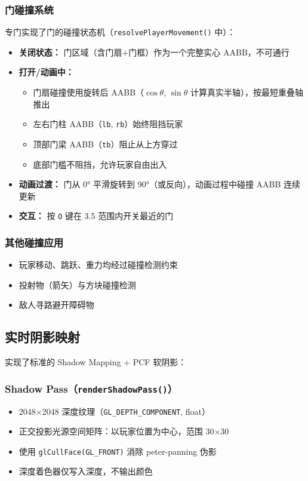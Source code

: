 \documentclass{article}
\begin{document}
\subsubsection{门碰撞系统}
专门实现了门的碰撞状态机（\texttt{resolvePlayerMovement()} 中）：

\begin{itemize}[nosep]
    \item \textbf{关闭状态：} 门区域（含门扇+门框）作为一个完整实心 AABB，不可通行
    \item \textbf{打开/动画中：}
          \begin{itemize}
              \item 门扇碰撞使用旋转后 AABB（$\cos\theta$, $\sin\theta$ 计算真实半轴），按最短重叠轴推出
              \item 左右门柱 AABB（\texttt{lb}, \texttt{rb}）始终阻挡玩家
              \item 顶部门梁 AABB（\texttt{tb}）阻止从上方穿过
              \item 底部门槛不阻挡，允许玩家自由出入
          \end{itemize}
    \item \textbf{动画过渡：} 门从 0° 平滑旋转到 90°（或反向），动画过程中碰撞 AABB 连续更新
    \item \textbf{交互：} 按 \texttt{O} 键在 3.5 范围内开关最近的门
\end{itemize}

\subsubsection{其他碰撞应用}
\begin{itemize}[nosep]
    \item 玩家移动、跳跃、重力均经过碰撞检测约束
    \item 投射物（箭矢）与方块碰撞检测
    \item 敌人寻路避开障碍物
\end{itemize}

\subsection{实时阴影映射}
\label{sec:shadow}

实现了标准的 Shadow Mapping + PCF 软阴影：

\subsubsection{Shadow Pass（\texttt{renderShadowPass()}）}
\begin{itemize}[nosep]
    \item 2048×2048 深度纹理（\texttt{GL\_DEPTH\_COMPONENT}, float）
    \item 正交投影光源空间矩阵：以玩家位置为中心，范围 30×30
    \item 使用 \texttt{glCullFace(GL\_FRONT)} 消除 peter-panning 伪影
    \item 深度着色器仅写入深度，不输出颜色
\end{itemize}
\end{document}
